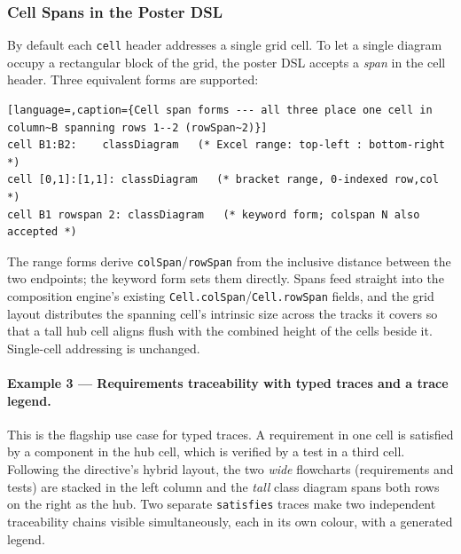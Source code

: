 \subsubsection{Cell Spans in the Poster DSL}
\label{sec:cdl-cell-spans}

By default each \texttt{cell} header addresses a single grid cell.  To let a
single diagram occupy a rectangular block of the grid, the poster DSL accepts a
\emph{span} in the cell header.  Three equivalent forms are supported:

\begin{lstlisting}[language=,caption={Cell span forms --- all three place one cell in column~B spanning rows 1--2 (rowSpan~2)}]
cell B1:B2:    classDiagram   (* Excel range: top-left : bottom-right *)
cell [0,1]:[1,1]: classDiagram   (* bracket range, 0-indexed row,col *)
cell B1 rowspan 2: classDiagram   (* keyword form; colspan N also accepted *)
\end{lstlisting}

\noindent The range forms derive \texttt{colSpan}/\texttt{rowSpan} from the
inclusive distance between the two endpoints; the keyword form sets them
directly.  Spans feed straight into the composition engine's existing
\texttt{Cell.colSpan}/\texttt{Cell.rowSpan} fields, and the grid layout
distributes the spanning cell's intrinsic size across the tracks it covers so
that a tall hub cell aligns flush with the combined height of the cells beside
it.  Single-cell addressing is unchanged.

\paragraph{Example 3 --- Requirements traceability with typed traces and a trace legend.}

This is the flagship use case for typed traces.  A requirement in one cell is
satisfied by a component in the hub cell, which is verified by a test in a
third cell.  Following the directive's hybrid layout, the two \emph{wide}
flowcharts (requirements and tests) are stacked in the left column and the
\emph{tall} class diagram spans both rows on the right as the hub.  Two
separate \texttt{satisfies} traces make two independent traceability chains
visible simultaneously, each in its own colour, with a generated legend.

